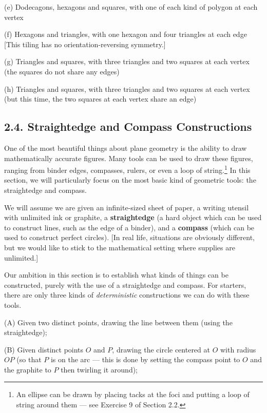 \documentclass[leqno]{book}
\begin{document}
\begin{enumerate}
(e) Dodecagons, hexagons and squares, with one of each kind of polygon at each vertex

(f) Hexagons and triangles, with one hexagon and four triangles at each edge [This tiling has no orientation-reversing symmetry.]

(g) Triangles and squares, with three triangles and two squares at each vertex (the squares do not share any edges)

(h) Triangles and squares, with three triangles and two squares at each vertex (but this time, the two squares at each vertex share an edge)
\end{enumerate}

\subsection*{2.4. Straightedge and Compass Constructions}
One of the most beautiful things about plane geometry is the ability to draw mathematically accurate figures.  Many tools can be used to draw these figures, ranging from binder edges, compasses, rulers, or even a loop of string.\footnote{An ellipse can be drawn by placing tacks at the foci and putting a loop of string around them \---- see Exercise 9 of Section 2.2.}  In this section, we will particularly focus on the most basic kind of geometric tools: the straightedge and compass.

We will assume we are given an infinite-sized sheet of paper, a writing utensil with unlimited ink or graphite, a \textbf{straightedge} (a hard object which can be used to construct lines, such as the edge of a binder), and a \textbf{compass} (which can be used to construct perfect circles).  [In real life, situations are obviously different, but we would like to stick to the mathematical setting where supplies are unlimited.]

Our ambition in this section is to establish what kinds of things can be constructed, purely with the use of a straightedge and compass.  For starters, there are only three kinds of \emph{deterministic} constructions we can do with these tools.

(A) Given two distinct points, drawing the line between them (using the straightedge);

(B) Given distinct points $O$ and $P$, drawing the circle centered at $O$ with radius $OP$ (so that $P$ is on the arc \---- this is done by setting the compass point to $O$ and the graphite to $P$ then twirling it around);
\end{document}
